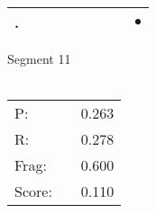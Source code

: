\documentclass[landscape]{article}
\newcommand{\ssp}{\hspace{2pt}}
\newcommand{\mex}{\cellcolor{g}$\bullet$}
\begin{document}
\begin{tabular}{|l|p{10pt}|p{10pt}|p{10pt}|p{10pt}|p{10pt}|p{10pt}|p{10pt}|p{10pt}|}
\hline
\ssp \cellcolor{ref7}. \ssp&\hspace{2pt}&\hspace{2pt}&\hspace{2pt}&\hspace{2pt}&\hspace{2pt}&\hspace{2pt}&\hspace{2pt}&\hspace{2pt}\mex\\
\hline
\end{tabular}

\vspace{6pt}
\noindent Segment 11\\\\
\noindent\begin{tabular}{lm{12pt}r}
\hline
P:&&0.263\\
R:&&0.278\\
Frag:&&0.600\\
Score:&&0.110\\
\end{tabular}

\newpage
\end{document}

